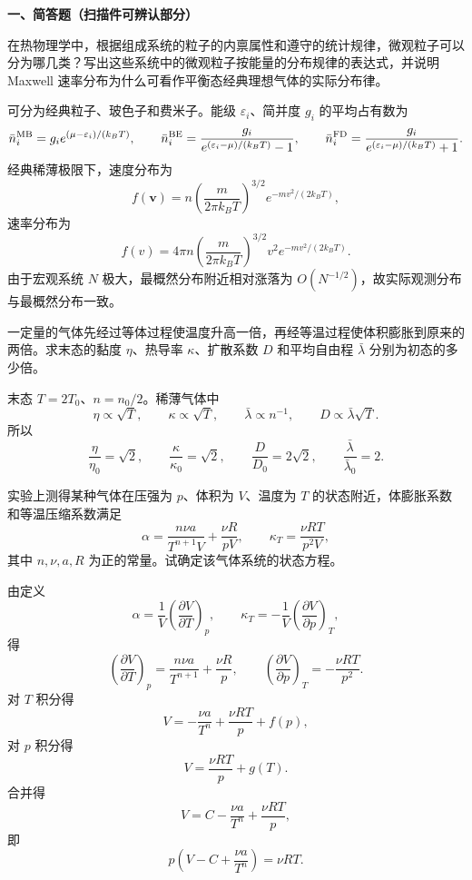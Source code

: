 ﻿

\textbf{一、简答题（扫描件可辨认部分）}

\begin{question}
在热物理学中，根据组成系统的粒子的内禀属性和遵守的统计规律，微观粒子可以分为哪几类？写出这些系统中的微观粒子按能量的分布规律的表达式，并说明 Maxwell 速率分布为什么可看作平衡态经典理想气体的实际分布律。
\begin{solution}
可分为经典粒子、玻色子和费米子。能级 $\varepsilon_i$、简并度 $g_i$ 的平均占有数为
\[
\bar n_i^{\rm MB}=g_i e^{(\mu-\varepsilon_i)/(k_BT)},\qquad
\bar n_i^{\rm BE}=\frac{g_i}{e^{(\varepsilon_i-\mu)/(k_BT)}-1},\qquad
\bar n_i^{\rm FD}=\frac{g_i}{e^{(\varepsilon_i-\mu)/(k_BT)}+1}.
\]
经典稀薄极限下，速度分布为
\[
f(\mathbf v)=n\left(\frac{m}{2\pi k_BT}\right)^{3/2}e^{-mv^2/(2k_BT)},
\]
速率分布为
\[
f(v)=4\pi n\left(\frac{m}{2\pi k_BT}\right)^{3/2}v^2e^{-mv^2/(2k_BT)}.
\]
由于宏观系统 $N$ 极大，最概然分布附近相对涨落为 $O(N^{-1/2})$，故实际观测分布与最概然分布一致。
\end{solution}
\end{question}

\begin{question}
一定量的气体先经过等体过程使温度升高一倍，再经等温过程使体积膨胀到原来的两倍。求末态的黏度 $\eta$、热导率 $\kappa$、扩散系数 $D$ 和平均自由程 $\bar\lambda$ 分别为初态的多少倍。
\begin{solution}
末态 $T=2T_0$、$n=n_0/2$。稀薄气体中
\[
\eta\propto\sqrt T,
\qquad \kappa\propto\sqrt T,
\qquad \bar\lambda\propto n^{-1},
\qquad D\propto \bar\lambda\sqrt T.
\]
所以
\[
\frac{\eta}{\eta_0}=\sqrt2,
\qquad
\frac{\kappa}{\kappa_0}=\sqrt2,
\qquad
\frac{D}{D_0}=2\sqrt2,
\qquad
\frac{\bar\lambda}{\bar\lambda_0}=2.
\]
\end{solution}
\end{question}

\begin{question}
实验上测得某种气体在压强为 $p$、体积为 $V$、温度为 $T$ 的状态附近，体膨胀系数和等温压缩系数满足
\[
\alpha=\frac{n\nu a}{T^{n+1}V}+\frac{\nu R}{pV},
\qquad
\kappa_T=\frac{\nu RT}{p^2V},
\]
其中 $n,\nu,a,R$ 为正的常量。试确定该气体系统的状态方程。
\begin{solution}
由定义
\[
\alpha=\frac1V\left(\frac{\partial V}{\partial T}\right)_p,
\qquad
\kappa_T=-\frac1V\left(\frac{\partial V}{\partial p}\right)_T,
\]
得
\[
\left(\frac{\partial V}{\partial T}\right)_p=\frac{n\nu a}{T^{n+1}}+\frac{\nu R}{p},
\qquad
\left(\frac{\partial V}{\partial p}\right)_T=-\frac{\nu RT}{p^2}.
\]
对 $T$ 积分得
\[
V=-\frac{\nu a}{T^n}+\frac{\nu RT}{p}+f(p),
\]
对 $p$ 积分得
\[
V=\frac{\nu RT}{p}+g(T).
\]
合并得
\[
V=C-\frac{\nu a}{T^n}+\frac{\nu RT}{p},
\]
即
\[
p\left(V-C+\frac{\nu a}{T^n}\right)=\nu RT.
\]
\end{solution}
\end{question}

